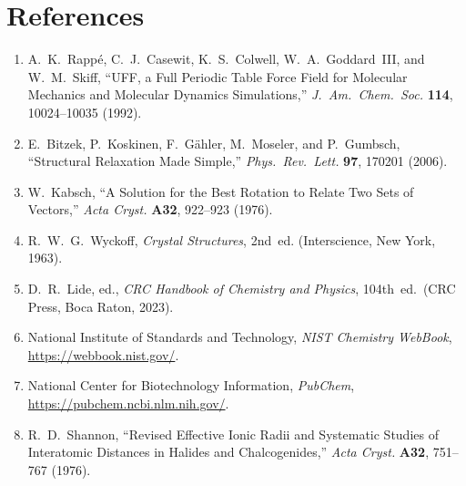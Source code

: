 \documentclass[11pt,twoside]{article}
\begin{document}
\section*{References}

\begin{enumerate}
  \item A.~K.~Rapp\'{e}, C.~J.~Casewit, K.~S.~Colwell, W.~A.~Goddard~III,
        and W.~M.~Skiff, ``UFF, a Full Periodic Table Force Field for
        Molecular Mechanics and Molecular Dynamics Simulations,''
        \textit{J.\ Am.\ Chem.\ Soc.} \textbf{114}, 10024--10035 (1992).

  \item E.~Bitzek, P.~Koskinen, F.~G\"{a}hler, M.~Moseler, and P.~Gumbsch,
        ``Structural Relaxation Made Simple,''
        \textit{Phys.\ Rev.\ Lett.} \textbf{97}, 170201 (2006).

  \item W.~Kabsch, ``A Solution for the Best Rotation to Relate Two Sets of
        Vectors,'' \textit{Acta Cryst.} \textbf{A32}, 922--923 (1976).

  \item R.~W.~G.~Wyckoff, \textit{Crystal Structures}, 2nd~ed.
        (Interscience, New York, 1963).

  \item D.~R.~Lide, ed., \textit{CRC Handbook of Chemistry and Physics},
        104th~ed.\ (CRC Press, Boca Raton, 2023).

  \item National Institute of Standards and Technology, \textit{NIST
        Chemistry WebBook}, \url{https://webbook.nist.gov/}.

  \item National Center for Biotechnology Information, \textit{PubChem},
        \url{https://pubchem.ncbi.nlm.nih.gov/}.

  \item R.~D.~Shannon, ``Revised Effective Ionic Radii and Systematic
        Studies of Interatomic Distances in Halides and Chalcogenides,''
        \textit{Acta Cryst.} \textbf{A32}, 751--767 (1976).
\end{enumerate}
\end{document}
